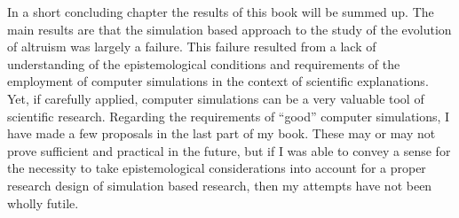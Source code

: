 In a short concluding chapter the results of this book will be summed up.
The main results are that the simulation based approach to the study of the
evolution of altruism was largely a failure. This failure resulted from a lack
of understanding of the epistemological conditions and requirements of the
employment of computer simulations in the context of scientific explanations.
Yet, if carefully applied, computer simulations can be a very valuable tool of
scientific research. Regarding the requirements of ``good'' computer
simulations, I have made a few proposals in the last part of my book. These
may or may not prove sufficient and practical in the future, but if I was able
to convey a sense for the necessity to take epistemological considerations
into account for a proper research design of simulation based research, then
my attempts have not been wholly futile.




